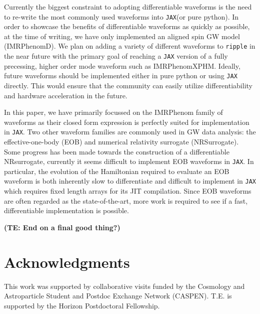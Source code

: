 \documentclass[twocolumn]{aastex631}
\newcommand{\jax}{\texttt{JAX}\xspace}
\newcommand{\ripple}{\texttt{ripple}\xspace}
\newcommand{\te}[1]{\textbf{\color{pyGreen}(TE: #1)}}
\begin{document}
Currently the biggest constraint to adopting differentiable waveforms is the need to re-write the most commonly used waveforms into \jax (or pure python).
In order to showcase the benefits of differentiable waveforms as quickly as possible, at the time of writing, we have only implemented an aligned spin GW model (IMRPhenomD).
We plan on adding a variety of different waveforms to \ripple in the near future with the primary goal of reaching a \jax version of a fully precessing, higher order mode waveform such as IMRPhenomXPHM.
Ideally, future waveforms should be implemented either in pure python or using \jax directly.
This would ensure that the community can easily utilize differentiability and hardware acceleration in the future.

In this paper, we have primarily focussed on the IMRPhenom family of waveforms as their closed form expression is perfectly suited for implementation in \jax.
Two other waveform families are commonly used in GW data analysis: the effective-one-body (EOB) and numerical relativity surrogate (NRSurrogate). 
Some progress has been made towards the construction of a differentiable NRsurrogate, currently it seems difficult to implement EOB waveforms in \jax.
In particular, the evolution of the Hamiltonian required to evaluate an EOB waveform is both inherently slow to differentiate and difficult to implement in \jax which requires fixed length arrays for its JIT compilation.
Since EOB waveforms are often regarded as the state-of-the-art, more work is required to see if a fast, differentiable implementation is possible.

\te{End on a final good thing?}

\section{Acknowledgments}
This work was supported by collaborative visits funded by the Cosmology and Astroparticle Student and Postdoc Exchange Network (CASPEN). 
T.E. is supported by the Horizon Postdoctoral Fellowship.


\end{document}
